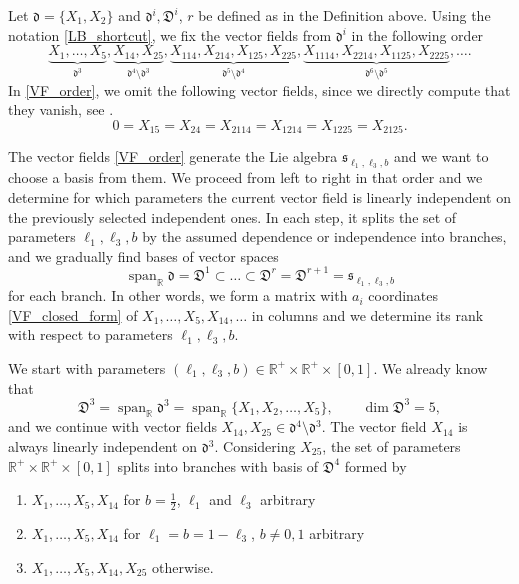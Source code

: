 \documentclass{amsart}
\theoremstyle{plain}
\theoremstyle{definition}
\theoremstyle{remark}
\newcommand{\R}{\mathbb{R}}
\newcommand{\mfk}[1]{\mathfrak{#1}}
\newcommand{\on}[1]{\operatorname{#1}}
\begin{document}
Let $\mfk{d} = \{X_1,X_2\}$ and $\mfk{d}^i, \mfk{D}^i$, $r$ be defined as in the Definition above. Using the notation \eqref{LB_shortcut}, we fix the vector fields from $\mfk{d}^i$ in the following order
\begin{equation} \label{VF_order}
    \underbrace{X_1,\dots,X_5}_{\mfk{d}^3}, \underbrace{X_{14} ,X_{25}}_{\mfk{d}^4\setminus \mfk{d}^3}, \underbrace{X_{114}, X_{214}, X_{125}, X_{225}}_{\mfk{d}^5 \setminus \mfk{d}^4}, \underbrace{X_{1114}, X_{2214}, X_{1125}, X_{2225}}_{\mfk{d}^6 \setminus \mfk{d}^5}, \dots.
\end{equation}
In \eqref{VF_order}, we omit the following vector fields, since we directly compute that they vanish, see \cite[\texttt{vectorfields.mw}]{attached_files}.
\[ 0 = X_{15} = X_{24} = X_{2114} = X_{1214} = X_{1225} = X_{2125}. \]

The vector fields \eqref{VF_order} generate the Lie algebra $\mfk{s}_{\ell_1, \ell_3, b}$ and we want to choose a basis from them. We proceed from left to right in that order and we determine for which parameters the current vector field is linearly independent on the previously selected independent ones. In each step, it splits the set of parameters $\ell_1, \ell_3, b$ by the assumed dependence or independence into branches, and we gradually find bases of vector spaces
\[\on{span}_\R \mfk{d} = \mfk{D}^1 \subset \dots \subset \mfk{D}^r = \mfk{D}^{r+1} = \mfk{s}_{\ell_1,\ell_3,b} \]
for each branch. In other words, we form a matrix with $a_i$ coordinates \eqref{VF_closed_form} of $X_1,\dots, X_5, X_{14}, \dots$ in columns and we determine its rank with respect to parameters $\ell_1, \ell_3, b$.

We start with parameters $(\ell_1,\ell_3,b) \in \R^+ \times \R^+ \times [0,1]$. We already know that
\[ \mfk{D}^3 = \on{span}_\R \mfk{d}^3 = \on{span}_\R \{X_1, X_2, \dots, X_5\},\qquad \dim \mfk{D}^3 = 5,\]
and we continue with vector fields $X_{14}, X_{25} \in \mfk{d}^4 \setminus \mfk{d}^3$. The vector field $X_{14}$ is always linearly independent on $\mfk{d}^3$. Considering $X_{25}$, the set of parameters $\R^+ \times \R^+ \times [0,1]$ splits into branches with basis of $\mfk{D}^4$ formed by
\begin{enumerate}[label=\arabic*)]
    \item $X_1, \dots, X_5, X_{14}$ for $b=\frac{1}{2}$, $\ell_1$ and $\ell_3$ arbitrary \label{branch1}
    \item $X_1, \dots, X_5, X_{14}$ for $\ell_1 = b = 1 - \ell_3$, $b\ne0,1$ arbitrary \label{branch2}
    \item $X_1, \dots, X_5, X_{14}, X_{25}$ otherwise. \label{branch3}
\end{enumerate}
\end{document}
